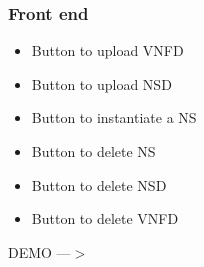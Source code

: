 \begin{frame}
\frametitle{Front end}

\begin{itemize}
		\item Button to upload VNFD
			\item Button to upload NSD
			\item Button to instantiate a NS
			\item Button to delete NS
			\item Button to delete NSD
			\item Button to delete VNFD
\end{itemize}

\Huge{\centerline{DEMO ---$ > $}}

\end{frame}